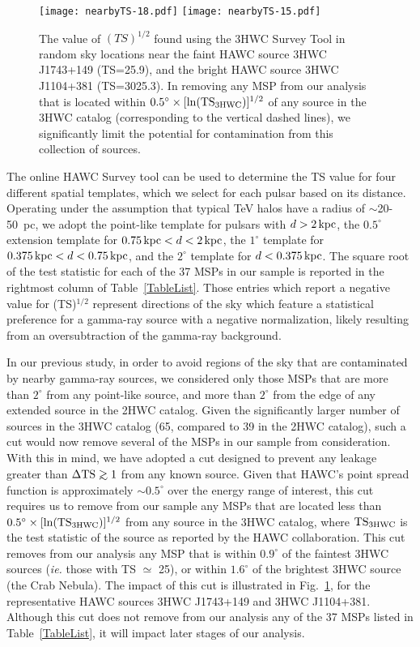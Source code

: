 \documentclass[aps,prd,twocolumn,amsmath,superscriptaddress,amssymb,showpacs,floatfix,nofootinbib,longbibliography,preprintnumbers]{revtex4-1}
\def\gsim{\mathrel{\raise.3ex\hbox{$>$\kern-.75em\lower1ex\hbox{$\sim$}}}}
\begin{document}
\begin{figure*}
\texttt{[image: nearbyTS-18.pdf]}
\texttt{[image: nearbyTS-15.pdf]}
\caption{The value of $(TS)^{1/2}$ found using the 3HWC Survey Tool in random sky locations near the faint HAWC source 3HWC J1743+149 (TS=25.9), and the bright HAWC source 3HWC J1104+381 (TS=3025.3). In removing any MSP from our analysis that is located within $0.5^{\circ} \times [\ln ({\rm TS}_{\rm 3HWC})]^{1/2}$ of any source in the 3HWC catalog (corresponding to the vertical dashed lines), we significantly limit the potential for contamination from this collection of sources.}
\label{nearbyTS}
\end{figure*}

The online HAWC Survey tool can be used to determine the TS value for four different spatial templates, which we select for each pulsar based on its distance. Operating under the assumption that typical TeV halos have a radius of $\sim$20-50~pc, we adopt the point-like template for pulsars with $d>2\,{\rm kpc}$, the $0.5^{\circ}$ extension template for $0.75 \, {\rm kpc} < d < 2 \, {\rm kpc}$, the $1^{\circ}$ template for $0.375 \, {\rm kpc} < d < 0.75 \, {\rm kpc}$, and the $2^{\circ}$ template for $d< 0.375 \, {\rm kpc}$. The square root of the test statistic for each of the 37 MSPs in our sample is reported in the rightmost column of Table~\ref{TableList}. Those entries which report a negative value for (TS)$^{1/2}$ represent directions of the sky which feature a statistical preference for a gamma-ray source with a negative normalization, likely resulting from an oversubtraction of the gamma-ray background.




In our previous study, in order to avoid regions of the sky that are contaminated by nearby gamma-ray sources, we considered only those MSPs that are more than $2^{\circ}$ from any point-like source, and more than $2^{\circ}$ from the edge of any extended source in the 2HWC catalog. Given the significantly larger number of sources in the 3HWC catalog (65, compared to 39 in the 2HWC catalog), such a cut would now remove several of the MSPs in our sample from consideration. With this in mind, we have adopted a cut designed to prevent any leakage greater than $\Delta {\rm TS} \gsim 1$ from any known source. Given that HAWC's point spread function is approximately $\sim 0.5^{\circ}$ over the energy range of interest, this cut requires us to remove from our sample any MSPs that are located less than $0.5^{\circ} \times [\ln ({\rm TS}_{\rm 3HWC})]^{1/2}$ from any source in the 3HWC catalog, where ${\rm TS}_{\rm 3HWC}$ is the test statistic of the source as reported by the HAWC collaboration. This cut removes from our analysis any MSP that is within $0.9^{\circ}$ of the faintest 3HWC sources (\textit{ie.} those with TS $\simeq$ 25), or within $1.6^{\circ}$ of the brightest 3HWC source (the Crab Nebula). The impact of this cut is illustrated in Fig.~\ref{nearbyTS}, for the representative HAWC sources 3HWC J1743+149 and 3HWC J1104+381. Although this cut does not remove from our analysis any of the 37 MSPs listed in Table~\ref{TableList}, it will impact later stages of our analysis. 
\end{document}
